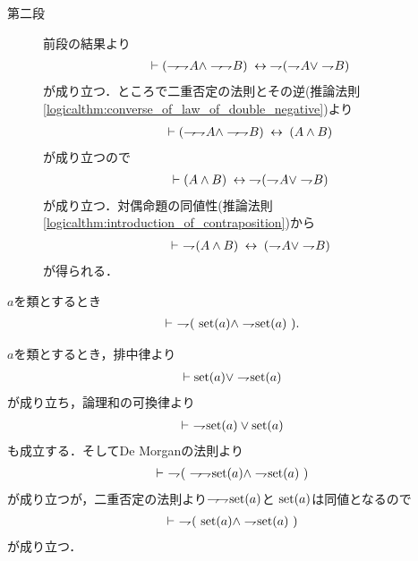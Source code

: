 \begin{prf}
\begin{description}
			\item[第二段]
				前段の結果より
				\begin{align}
					\vdash (\negation \negation A \wedge \negation \negation B)
					\lrarrow \negation (\negation A \vee \negation B)
				\end{align}
				が成り立つ．ところで二重否定の法則とその逆(推論法則\ref{logicalthm:converse_of_law_of_double_negative})より
				\begin{align}
					\vdash (\negation \negation A \wedge \negation \negation B)
					\lrarrow (A \wedge B)
				\end{align}
				が成り立つので
				\begin{align}
					\vdash (A \wedge B) 
					\lrarrow \negation (\negation A \vee \negation B)
				\end{align}
				が成り立つ．対偶命題の同値性(推論法則\ref{logicalthm:introduction_of_contraposition})から
				\begin{align}
					\vdash\ \negation (A \wedge B)
					\lrarrow (\negation A \vee \negation B)
				\end{align}
				が得られる．
				\QED
		\end{description}
	\end{prf}
	
	
	\begin{screen}
		\begin{thm}[集合であり真類でもある類は存在しない]
			$a$を類とするとき
			\begin{align}
				\vdash\ \negation (\ \set{a} \wedge \negation \set{a}\ ).
			\end{align}
		\end{thm}
	\end{screen}
	
	\begin{prf}
		$a$を類とするとき，排中律より
		\begin{align}
			\vdash \set{a} \vee \negation \set{a}
		\end{align}
		が成り立ち，論理和の可換律より
		\begin{align}
			\vdash\ \negation \set{a} \vee \set{a}
		\end{align}
		も成立する．そしてDe Morganの法則より
		\begin{align}
			\vdash\ \negation (\ \negation \negation \set{a} \wedge \negation \set{a}\ )
		\end{align}
		が成り立つが，二重否定の法則より$\negation \negation \set{a}$と
		$\set{a}$は同値となるので
		\begin{align}
			\vdash\ \negation (\ \set{a} \wedge \negation \set{a}\ )
		\end{align}
		が成り立つ．
		\QED
	\end{prf}
	
